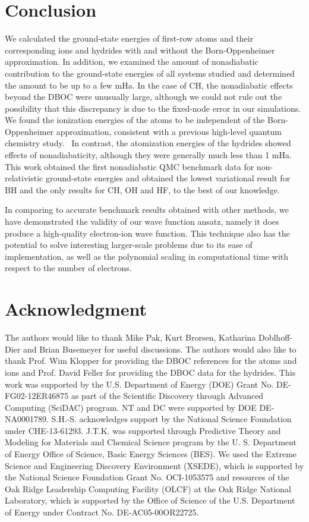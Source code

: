 \documentclass[aip,jcp,numerical,reprint]{revtex4-1}
\begin{document}
\section{Conclusion}
We calculated the ground-state energies of first-row atoms and their corresponding ions and hydrides with and without the Born-Oppenheimer approximation. In addition, we examined the amount of nonadiabatic contribution to the ground-state energies of all systems studied and determined the amount to be up to a few mHa. In the case of CH, the nonadiabatic effects beyond the DBOC were unusually large, although we could not rule out the possibility that this discrepancy is due to the fixed-node error in our simulations. %
We found the ionization energies of the atoms to be independent of the Born-Oppenheimer approximation, consistent with a previous high-level quantum chemistry study.~\cite{Klopper_IP} In contrast, the atomization energies of the hydrides showed effects of nonadiabaticity, although they were generally much less than 1 mHa. This work obtained the first nonadiabatic QMC benchmark data for non-relativistic ground-state energies and obtained the lowest variational result for BH and the only results for CH, OH and HF, to the best of our knowledge.

In comparing to accurate benchmark results obtained with other methods, we have demonstrated the validity of our wave function ansatz, namely it does produce a high-quality electron-ion wave function. This technique also has the potential to solve interesting larger-scale problems due to its ease of implementation, as well as the polynomial scaling in computational time with respect to the number of electrons.

\section{Acknowledgment}
The authors would like to thank Mike Pak, Kurt Brorsen, Katharina Doblhoff-Dier and Brian Busemeyer for useful discussions. The authors would also like to thank Prof. Wim Klopper for providing the DBOC references for the atoms and ions and Prof. David Feller for providing the DBOC data for the hydrides. This work was supported by the U.S. Department of Energy (DOE) Grant No. DE-FG02-12ER46875 as part of the Scientific Discovery through Advanced Computing (SciDAC) program. NT and DC were supported by DOE DE-NA0001789. S.H.-S. acknowledges support by the National Science Foundation under CHE-13-61293. J.T.K. was supported through Predictive Theory and Modeling for Materials and Chemical Science program by the U. S. Department of Energy Office of Science, Basic Energy Sciences (BES). We used the Extreme Science and Engineering Discovery Environment (XSEDE), which is supported by the National Science Foundation Grant No. OCI-1053575 and resources of the Oak Ridge Leadership Computing Facility (OLCF) at the Oak Ridge National Laboratory, which is supported by the Office of Science of the U.S. Department of Energy under Contract No. DE-AC05-00OR22725.


\end{document}
